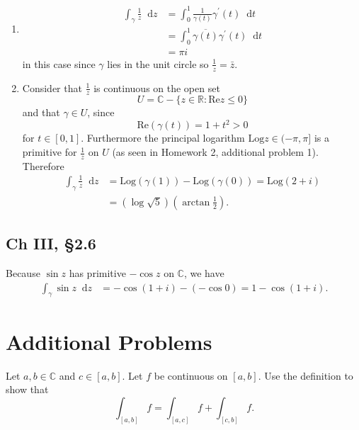 \documentclass{article}
\newcommand\dif{\mathop{}\!\mathrm{d}}
\newcounter{Problem}
\newenvironment{Problem}{\begin{Exercise}[name={Problem},
                                          counter={Problem}]}
                        {\end{Exercise}}
\begin{document}
\begin{itemize}
{\begin{enumerate}[label=(\alph*)]
      \item{
        \begin{align*}
           \int_\gamma \frac{1}{z} \dif z
        &= \int_0^1 \frac{1}{\gamma(t)} \gamma^\prime(t) \dif t \\
        &= \int_0^1 \overline{\gamma(t)} \gamma^\prime(t) \dif t \\
        &= \pi i
        \end{align*}
        in this case since $\gamma$ lies in the unit circle so
        $\frac{1}{z} = \bar{z}$.
      }
      \item{
        Consider that $\frac{1}{z}$ is continuous on the open set
        $$
        U = \mathbb{C} - \{ z \in \mathbb{R} : \mathrm{Re} z \leq 0 \}
        $$
        and that $\gamma \in U$, since
        $$
        \mathrm{Re} (\gamma(t)) = 1 + t^2 > 0
        $$
        for $t \in [0, 1]$. Furthermore the principal logarithm
        $\mathrm{Log} z \in (-\pi, \pi]$ is a primitive for
        $\frac{1}{z}$ on $U$ (as seen in Homework 2, additional problem 1).
        Therefore
        \begin{align*}
        \int_\gamma \frac{1}{z} \dif z
        &=
        \mathrm{Log}(\gamma(1)) - \mathrm{Log}(\gamma(0))
         =
        \mathrm{Log}(2 + i) \\
        &= (\log \sqrt{5})\left(\arctan \frac{1}{2}\right).
        \end{align*}
      }
    \end{enumerate}
  }
\end{itemize}

\subsection*{Ch III, \S 2.6}
Because $\sin z$ has primitive $-\cos z$ on $\mathbb{C}$,
we have
\begin{align*}
   \int_\gamma \sin z \dif z
&= -\cos(1 + i) - (-\cos 0)
 = 1 - \cos (1 + i).
\end{align*}

\section{Additional Problems}

\begin{Problem}
Let $a, b \in \mathbb{C}$ and $c \in [a, b]$. Let $f$ be continuous
on $[a, b]$. Use the definition to show that
$$
\int_{[a, b]} f = \int_{[a, c]} f + \int_{[c, b]} f.
$$
\end{Problem}
\end{document}
